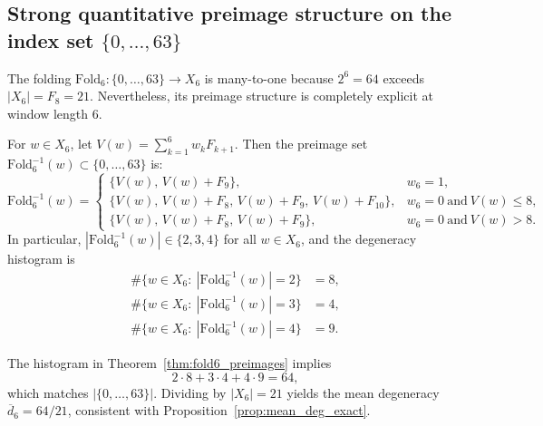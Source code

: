 \subsection{Strong quantitative preimage structure on the index set \texorpdfstring{$\{0,\dots,63\}$}{0..63}}
The folding $\mathrm{Fold}_6:\{0,\dots,63\}\to X_6$ is many-to-one because $2^6=64$ exceeds $|X_6|=F_8=21$.
Nevertheless, its preimage structure is completely explicit at window length $6$.

\begin{theorem}
\label{thm:fold6_preimages}
For $w\in X_6$, let $V(w)=\sum_{k=1}^6 w_k F_{k+1}$.
Then the preimage set $\mathrm{Fold}_6^{-1}(w)\subset\{0,\dots,63\}$ is:
\[
\mathrm{Fold}_6^{-1}(w)=
\begin{cases}
\{V(w),\,V(w)+F_9\}, & w_6=1,\\[4pt]
\{V(w),\,V(w)+F_8,\,V(w)+F_9,\,V(w)+F_{10}\}, & w_6=0\ \text{and}\ V(w)\le 8,\\[4pt]
\{V(w),\,V(w)+F_8,\,V(w)+F_9\}, & w_6=0\ \text{and}\ V(w)> 8.
\end{cases}
\]
In particular, $|\mathrm{Fold}_6^{-1}(w)|\in\{2,3,4\}$ for all $w\in X_6$, and the degeneracy histogram is
\[
\begin{aligned}
\#\{w\in X_6:\ |\mathrm{Fold}_6^{-1}(w)|=2\}&=8,\\
\#\{w\in X_6:\ |\mathrm{Fold}_6^{-1}(w)|=3\}&=4,\\
\#\{w\in X_6:\ |\mathrm{Fold}_6^{-1}(w)|=4\}&=9.
\end{aligned}
\]
\end{theorem}

\begin{remark}
The histogram in Theorem~\ref{thm:fold6_preimages} implies
\[
2\cdot 8+3\cdot 4+4\cdot 9=64,
\]
which matches $|\{0,\dots,63\}|$.
Dividing by $|X_6|=21$ yields the mean degeneracy $\overline{d}_6=64/21$, consistent with Proposition~\ref{prop:mean_deg_exact}.
\end{remark}

